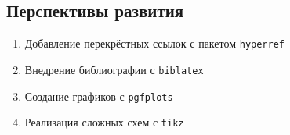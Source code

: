 \documentclass[a4paper,12pt]{article}
\begin{document}
\subsection{Перспективы развития}
\begin{enumerate}
    \item Добавление перекрёстных ссылок с пакетом \texttt{hyperref}
    \item Внедрение библиографии с \texttt{biblatex}
    \item Создание графиков с \texttt{pgfplots}
    \item Реализация сложных схем с \texttt{tikz}
\end{enumerate}
\end{document}
